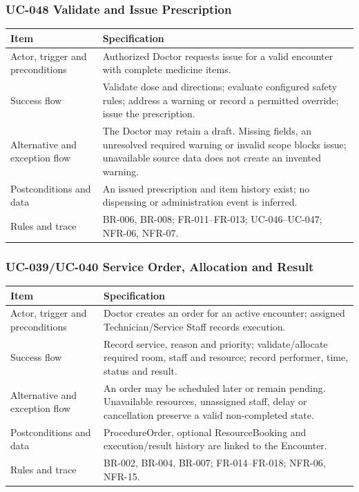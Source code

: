 \documentclass[a4paper,12pt]{article}
\begin{document}
\subsubsection{UC-048 Validate and Issue Prescription}
\begin{longtable}{@{}p{}p{}@{}}
\toprule Item & Specification \\
\midrule
Actor, trigger and preconditions & Authorized Doctor requests issue for a valid encounter with complete medicine items. \\
Success flow & Validate dose and directions; evaluate configured safety rules; address a warning or record a permitted override; issue the prescription. \\
Alternative and exception flow & The Doctor may retain a draft. Missing fields, an unresolved required warning or invalid scope blocks issue; unavailable source data does not create an invented warning. \\
Postconditions and data & An issued prescription and item history exist; no dispensing or administration event is inferred. \\
Rules and trace & BR-006, BR-008; FR-011--FR-013; UC-046--UC-047; NFR-06, NFR-07. \\
\bottomrule
\end{longtable}

\subsubsection{UC-039/UC-040 Service Order, Allocation and Result}
\begin{longtable}{@{}p{}p{}@{}}
\toprule Item & Specification \\
\midrule
Actor, trigger and preconditions & Doctor creates an order for an active encounter; assigned Technician/Service Staff records execution. \\
Success flow & Record service, reason and priority; validate/allocate required room, staff and resource; record performer, time, status and result. \\
Alternative and exception flow & An order may be scheduled later or remain pending. Unavailable resources, unassigned staff, delay or cancellation preserve a valid non-completed state. \\
Postconditions and data & ProcedureOrder, optional ResourceBooking and execution/result history are linked to the Encounter. \\
Rules and trace & BR-002, BR-004, BR-007; FR-014--FR-018; NFR-06, NFR-15. \\
\bottomrule
\end{longtable}
\end{document}
